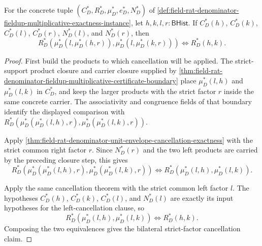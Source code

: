 \begin{theorem}
\label{thm:field-rat-denominator-bilateral-strict-factor-cancellation}
For the concrete tuple
$(C_D^\ast,R_D^\ast,\mu_D^\ast,e_D^\ast,N_D^\ast)$ of
\autoref{def:field-rat-denominator-fieldup-multiplicative-exactness-instance},
let $h,k,l,r:\mathsf{BHist}$. If $C_D^\ast(h)$, $C_D^\ast(k)$,
$C_D^\ast(l)$, $C_D^\ast(r)$, $N_D^\ast(l)$, and $N_D^\ast(r)$, then
$$
R_D^\ast(\mu_D^\ast(l,\mu_D^\ast(h,r)),
\mu_D^\ast(l,\mu_D^\ast(k,r)))
\Longleftrightarrow R_D^\ast(h,k).
$$
\end{theorem}
\begin{proof}
First build the products to which cancellation will be applied. The
strict-support product closure and carrier closure supplied by
\autoref{thm:field-rat-denominator-fieldup-multiplicative-certificate-boundary}
place $\mu_D^\ast(l,h)$ and $\mu_D^\ast(l,k)$ in $C_D^\ast$, and keep the
larger products with the strict factor $r$ inside the same concrete carrier.
The associativity and congruence fields of that boundary identify the displayed
comparison with
$R_D^\ast(\mu_D^\ast(\mu_D^\ast(l,h),r),
\mu_D^\ast(\mu_D^\ast(l,k),r))$.

Apply
\autoref{thm:field-rat-denominator-unit-envelope-cancellation-exactness} with
the strict common right factor $r$. Since $N_D^\ast(r)$ and the two left
products are carried by the preceding closure step, this gives
$$
R_D^\ast(\mu_D^\ast(\mu_D^\ast(l,h),r),
\mu_D^\ast(\mu_D^\ast(l,k),r))
\Longleftrightarrow
R_D^\ast(\mu_D^\ast(l,h),\mu_D^\ast(l,k)).
$$

Apply the same cancellation theorem with the strict common left factor $l$.
The hypotheses $C_D^\ast(h)$, $C_D^\ast(k)$, $C_D^\ast(l)$, and
$N_D^\ast(l)$ are exactly its input hypotheses for the left-cancellation
clause, so
$$
R_D^\ast(\mu_D^\ast(l,h),\mu_D^\ast(l,k))
\Longleftrightarrow R_D^\ast(h,k).
$$
Composing the two equivalences gives the bilateral strict-factor cancellation
claim.
\end{proof}
